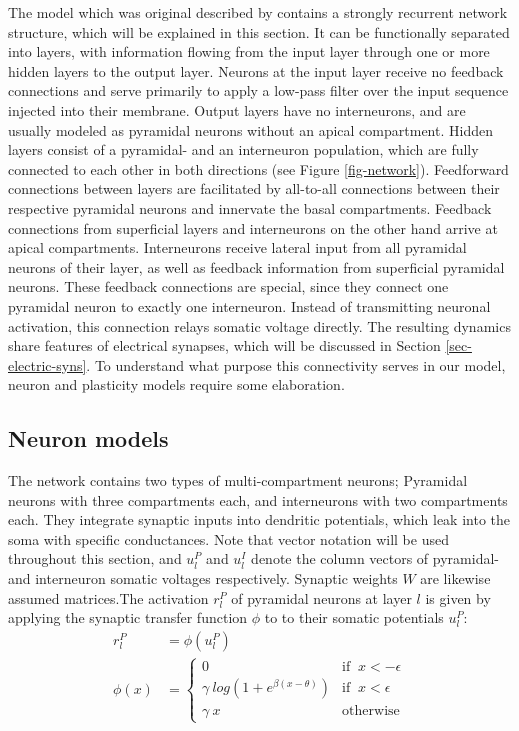 The model which was original described by \cite{sacramento2018dendritic} contains a strongly recurrent network
structure, which will be explained in this section. It can be functionally separated into layers, with information
flowing from the input layer through one or more hidden layers to the output layer. Neurons at the input layer receive
no feedback connections and serve primarily to apply a low-pass filter over the input sequence injected into their
membrane. Output layers have no interneurons, and are usually modeled as pyramidal neurons without an apical
compartment. Hidden layers consist of a pyramidal- and an interneuron population, which are fully connected to each
other in both directions (see Figure \ref{fig-network}). Feedforward connections between layers are facilitated by
all-to-all connections between their respective pyramidal neurons and innervate the basal compartments. Feedback
connections from superficial layers and interneurons on the other hand arrive at apical compartments. Interneurons
receive lateral input from all pyramidal neurons of their layer, as well as feedback information from superficial
pyramidal neurons. These feedback connections are special, since they connect one pyramidal neuron to exactly one
interneuron. Instead of transmitting neuronal activation, this connection relays somatic voltage directly. The resulting
dynamics share features of electrical synapses, which will be discussed in Section \ref{sec-electric-syns}. To
understand what purpose this connectivity serves in our model, neuron and plasticity models require some elaboration.


\subsection{Neuron models}\label{sec-neurons}



The network contains two types of multi-compartment neurons; Pyramidal neurons with three compartments each, and
interneurons with two compartments each. They integrate synaptic inputs into dendritic potentials, which leak into the
soma with specific conductances. Note that vector notation will be used throughout this section, and $u_l^P$ and $u_l^I$
denote the column vectors of pyramidal- and interneuron somatic voltages respectively. Synaptic weights $W$ are likewise
assumed matrices.The activation $r_l^P$ of pyramidal neurons at layer $l$ is given by applying the synaptic transfer
function $\phi$ to to their somatic potentials $u_l^P$:
\begin{align}
  r_l^P   & = \phi(u_l^P)                                                        \\
  \phi(x) & = \begin{cases}
                0                                   & \textrm{if } \ x < -\epsilon \\
                \gamma \ log(1+e^{\beta(x-\theta)}) & \textrm{if } \ x < \epsilon  \\
                \gamma \ x                          & \textrm{otherwise}
              \end{cases}
\end{align}

